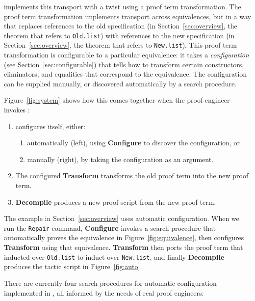 \toolname implements this transport with a twist using a proof term transformation.
The proof term transformation implements transport across equivalences,
but in a way that replaces references to the old specification (in Section~\ref{sec:overview}, the theorem that refers to \lstinline{Old.list})
with references to the new specification (in Section~\ref{sec:overview}, the theorem that refers to \lstinline{New.list}).
This proof term transformation is configurable to a particular equivalence:
it takes a \textit{configuration} (see Section~\ref{sec:configurable}) 
that tells \toolname how to transform certain constructors, eliminators, and equalities that 
correspond to the equivalence.
The configuration can be supplied manually, or discovered automatically by a search procedure.

Figure~\ref{fig:system} shows how this comes together when the proof engineer invokes \toolname:

\begin{enumerate}
\item \toolname configures itself, either:
\begin{enumerate}
\item automatically (left), using \textbf{Configure} to discover the configuration, or
\item manually (right), by taking the configuration as an argument.
\end{enumerate}
\item The configured \textbf{Transform} transforms the old proof term into the new proof term.
\item \textbf{Decompile} produces a new proof script from the new proof term.
\end{enumerate}

The example in Section~\ref{sec:overview} uses automatic configuration. When we run the \lstinline{Repair} command,
\textbf{Configure} invokes a search procedure that automatically proves the equivalence in Figure~\ref{fig:equivalence},
then configures \textbf{Transform} using that equivalence.
\textbf{Transform} then ports the proof term that inducted over \lstinline{Old.list}
to induct over \lstinline{New.list}, and finally
\textbf{Decompile} produces the tactic script in Figure~\ref{fig:auto}.

There are currently four search procedures for automatic configuration implemented in \toolname,
all informed by the needs of real proof engineers:

